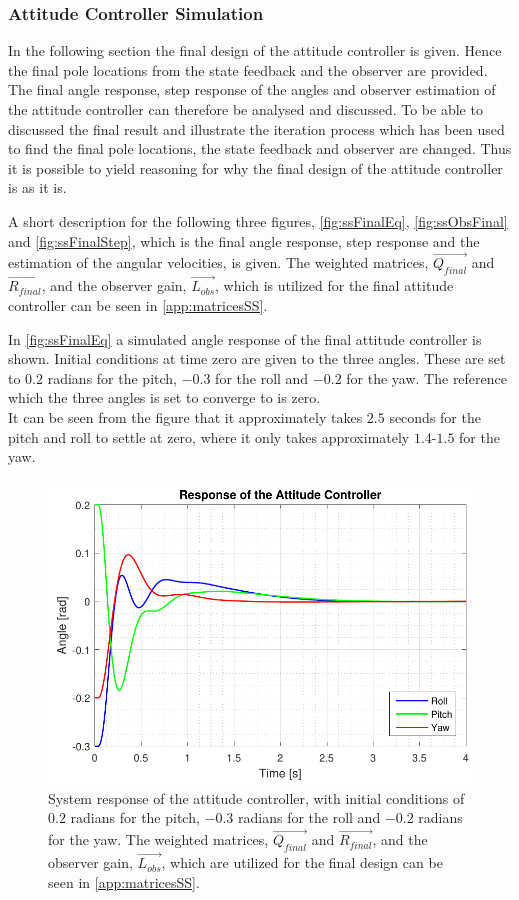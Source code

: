 \subsubsection{Attitude Controller Simulation}
In the following section the final design of the attitude controller is given. Hence the final pole locations from the state feedback and the observer are provided. The final angle response, step response of the angles and observer estimation of the attitude controller can therefore be analysed and discussed. To be able to discussed the final result and illustrate the iteration process which has been used to find the final pole locations, the state feedback and observer are changed. Thus it is possible to yield reasoning for why the final design of the attitude controller is as it is.

A short description for the following three figures, \autoref{fig:ssFinalEq}, \autoref{fig:ssObsFinal} and \autoref{fig:ssFinalStep}, which is the final angle response, step response and the estimation of the angular velocities, is given. The weighted matrices, $\vec{Q_{final}}$ and $\vec{R_{final}}$, and the observer gain, $\vec{L_{obs}}$, which is utilized for the final attitude controller can be seen in \autoref{app:matricesSS}.

In \autoref{fig:ssFinalEq} a simulated angle response of the final attitude controller is shown. Initial conditions at time zero are given to the three angles. These are set to $0.2$ radians for the pitch, $-0.3$ for the roll and $-0.2$ for the yaw. The reference which the three angles is set to converge to is zero. \\ It can be seen from the figure that it approximately takes $2.5$ seconds for the pitch and roll to settle at zero, where it only takes approximately $1.4$-$1.5$ for the yaw.

\begin{figure}[H]
	\centering
	\includegraphics[scale=0.8]{figures/ssFinalEq.pdf}
	\caption{System response of the attitude controller, with initial conditions of $0.2$ radians for the pitch, $-0.3$ radians for the roll and $-0.2$ radians for the yaw. The weighted matrices, $\vec{Q_{final}}$ and $\vec{R_{final}}$, and the observer gain, $\vec{L_{obs}}$, which are utilized for the final design can be seen in \autoref{app:matricesSS}.}
	\label{fig:ssFinalEq}
\end{figure}

